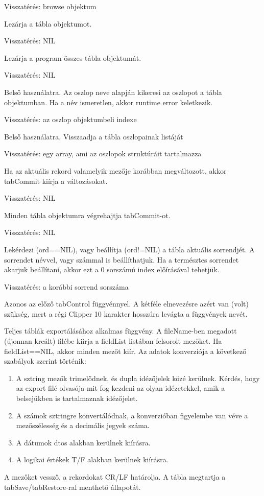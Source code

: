 Visszatérés: browse objektum


Lezárja a tábla objektumot.

Visszatérés: NIL
 
Lezárja a program összes tábla objektumát.

Visszatérés: NIL


Belső használatra. Az oszlop neve alapján kikeresi az
oszlopot a tábla objektumban. Ha a név ismeretlen, akkor
runtime error keletkezik.

Visszatérés: az oszlop objektumbeli indexe


Belső használatra. Visszaadja a tábla oszlopainak listáját

Visszatérés: egy array, ami az oszlopok struktúráit tartalmazza
 

Ha az aktuális rekord valamelyik mezője korábban megváltozott,
akkor tabCommit kiírja a változásokat.

Visszatérés: NIL
 
Minden tábla objektumra végrehajtja tabCommit-ot.

Visszatérés: NIL
 

Lekérdezi (ord==NIL), vagy beállítja (ord!=NIL) a tábla aktuális 
sorrendjét.  A sorrendet névvel, vagy számmal is beállíthatjuk. 
Ha a természtes sorrendet akarjuk beállítani, akkor ezt a 0 sorszámú 
index előírásával tehetjük.

Visszatérés: a korábbi sorrend sorszáma


Azonos az előző tabControl függvénnyel. A kétféle elnevezésre
azért van (volt) szükség, mert a régi Clipper 10 karakter
hosszúra levágta a függvények nevét.


Teljes táblák exportálásához alkalmas függvény. A fileName-ben
megadott (újonnan kreált) filébe kiírja a fieldList listában
felsorolt mezőket. Ha fieldList==NIL, akkor minden mezőt kiír.
Az adatok konverziója a következő szabályok szerint történik:
\begin{enumerate}
\item A sztring mezők trimelődnek, és dupla idézőjelek közé
      kerülnek. Kérdés, hogy az export filé olvasója mit fog
      kezdeni az olyan idézetekkel, amik a belsejükben is tartalmaznak
      idézőjelet.
\item A számok sztringre konvertálódnak, a konverzióban figyelembe
      van véve a mezőszélesség és a decimális jegyek száma.
\item A dátumok dtos alakban kerülnek kiírásra.
\item A logikai értékek T/F alakban kerülnek kiírásra.
\end{enumerate}
A mezőket vessző, a rekordokat CR/LF határolja.
A tábla megtartja a tabSave/tabRestore-ral menthető állapotát.
  
